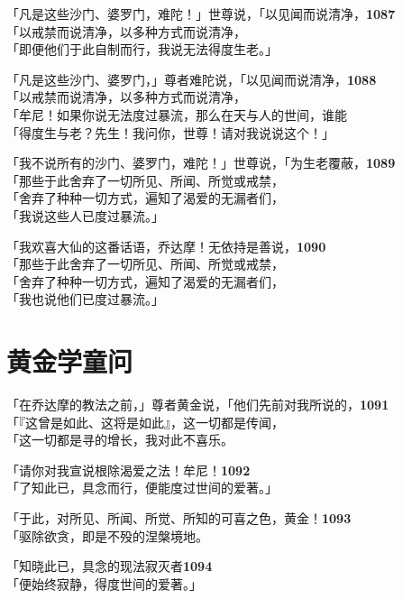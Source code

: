 「凡是这些沙门、婆罗门，难陀！」世尊说，「以见闻而说清净，\hfill{\grayfootnotesize \textbf{1087}} \\
「以戒禁而说清净，以多种方式而说清净，\\
「即便他们于此自制而行，我说无法得度生老。」


「凡是这些沙门、婆罗门，」尊者难陀说，「以见闻而说清净，\hfill{\grayfootnotesize \textbf{1088}} \\
「以戒禁而说清净，以多种方式而说清净，\\
「牟尼！如果你说无法度过暴流，那么在天与人的世间，谁能\\
「得度生与老？先生！我问你，世尊！请对我说说这个！」


「我不说所有的沙门、婆罗门，难陀！」世尊说，「为生老覆蔽，\hfill{\grayfootnotesize \textbf{1089}} \\
「那些于此舍弃了一切所见、所闻、所觉或戒禁，\\
「舍弃了种种一切方式，遍知了渴爱的无漏者们，\\
「我说这些人已度过暴流。」


「我欢喜大仙的这番话语，乔达摩！无依持是善说，\hfill{\grayfootnotesize \textbf{1090}} \\
「那些于此舍弃了一切所见、所闻、所觉或戒禁，\\
「舍弃了种种一切方式，遍知了渴爱的无漏者们，\\
「我也说他们已度过暴流。」


\section{黄金学童问}

「在乔达摩的教法之前，」尊者黄金说，「他们先前对我所说的，\hfill{\grayfootnotesize \textbf{1091}} \\
「『这曾是如此、这将是如此』，这一切都是传闻，\\
「这一切都是寻的增长，我对此不喜乐。


「请你对我宣说根除渴爱之法！牟尼！\hfill{\grayfootnotesize \textbf{1092}} \\
「了知此已，具念而行，便能度过世间的爱著。」

「于此，对所见、所闻、所觉、所知的可喜之色，黄金！\hfill{\grayfootnotesize \textbf{1093}} \\
「驱除欲贪，即是不殁的涅槃境地。


「知晓此已，具念的现法寂灭者\hfill{\grayfootnotesize \textbf{1094}} \\
「便始终寂静，得度世间的爱著。」


